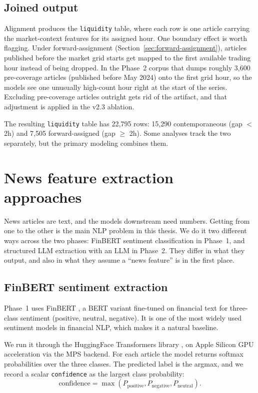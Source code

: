 \subsection{Joined output}\label{sec:joined-output}

Alignment produces the \texttt{liquidity} table, where each row is one article carrying the market-context features for its assigned hour. One boundary effect is worth flagging. Under forward-assignment (Section~\ref{sec:forward-assignment}), articles published before the market grid starts get mapped to the first available trading hour instead of being dropped. In the Phase~2 corpus that dumps roughly 3{,}600 pre-coverage articles (published before May 2024) onto the first grid hour, so the models see one unusually high-count hour right at the start of the series. Excluding pre-coverage articles outright gets rid of the artifact, and that adjustment is applied in the v2.3 ablation.

The resulting \texttt{liquidity} table has 22{,}795 rows: 15{,}290 contemporaneous (gap $<$ 2h) and 7{,}505 forward-assigned (gap $\geq$ 2h). Some analyses track the two separately, but the primary modeling combines them.

\section{News feature extraction approaches}\label{sec:feature-extraction}

News articles are text, and the models downstream need numbers. Getting from one to the other is the main NLP problem in this thesis. We do it two different ways across the two phases: FinBERT sentiment classification in Phase~1, and structured LLM extraction with an LLM in Phase~2. They differ in what they output, and also in what they assume a ``news feature'' is in the first place.

\subsection{FinBERT sentiment extraction}\label{sec:finbert}

Phase~1 uses FinBERT \citep{araci2019}, a BERT variant fine-tuned on financial text for three-class sentiment (positive, neutral, negative). It is one of the most widely used sentiment models in financial NLP, which makes it a natural baseline.

We run it through the HuggingFace Transformers library \citep{wolf2020}, on Apple Silicon GPU acceleration via the MPS backend. For each article the model returns softmax probabilities over the three classes. The predicted label is the argmax, and we record a scalar \texttt{confidence} as the largest class probability:
\begin{equation}
  \text{confidence} = \max(P_{\text{positive}}, P_{\text{negative}}, P_{\text{neutral}}) .
\end{equation}

